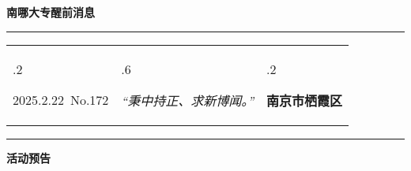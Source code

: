 \documentclass[letterpaper, 12pt]{article}
\begin{document}
\begin{center}
    \Huge\textbf{南哪大专醒前消息}
\end{center}
\vspace{4mm}
\hrule
\renewcommand\tabularxcolumn[1]{m{#1}}
\begin{tabularx}{\textwidth}{>{\hsize.2\hsize}X>{\hsize.6\hsize}X>{\hsize.2\hsize}X}
    \begin{flushleft}
        2025.2.22\, No.172
    \end{flushleft}
    &
    \begin{center}
        \textit{“秉中持正、求新博闻。”}
    \end{center}
    &
    \begin{flushright}
        \textbf{南京市栖霞区}
    \end{flushright}
\end{tabularx}
\vspace{-3.5mm}
\hrule
\vspace{4mm}
\centerline{\huge\textbf{活动预告}}
\end{document}
